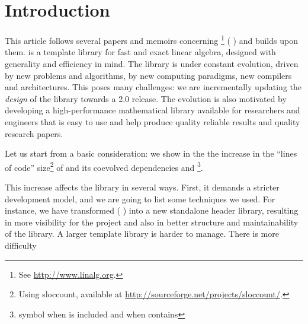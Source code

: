 \section{Introduction}
%
This article follows several papers and memoirs concerning \linbox%
%
\footnote{See \url{http://www.linalg.org}.}
%
(\cf{} \cite{Giorgi:2004:these,Turner:2002:these,Boyer:2012:these,Dumas:2002:icms,Dumas:2010:lbpar})
and builds upon them.
%
\linbox is a \cpp template library for fast and exact linear algebra, designed with generality
and efficiency in mind.
%
%
The \linbox library is under constant evolution, driven by new problems and
algorithms, by new computing paradigms, new compilers and architectures. This
poses many challenges: we are incrementally
updating the \emph{design} of the library towards a \textsf{2.0} release.
The evolution is also motivated by developing a high-performance mathematical
library available for researchers and engineers that is easy to use and help
produce quality reliable results and quality research papers.
%
\par
%
Let us start from a basic consideration: we show in the  the
increase in the ``lines of code'' size\footnote{Using \textsf{sloccount}, available at
\url{http://sourceforge.net/projects/sloccount/}.}
%
of \linbox and its coevolved dependencies \givaro and
\fflasffpack\footnote{symbol \td when \givaro is included and \tdd when
contains \fflasffpack}.
%
%

%
This increase affects the library in several ways.  First, it demands a
stricter development model, and we are going to list some techniques we used.
For instance, we have transformed \fflasffpack %
%
(\cf{} \cite{Dumas:2008:Flas}) into a new standalone header library, resulting
in more visibility for the \fflasffpack project
and also in better structure and maintainability of the library.
%
%
A larger template library is harder to manage. There is more difficulty
